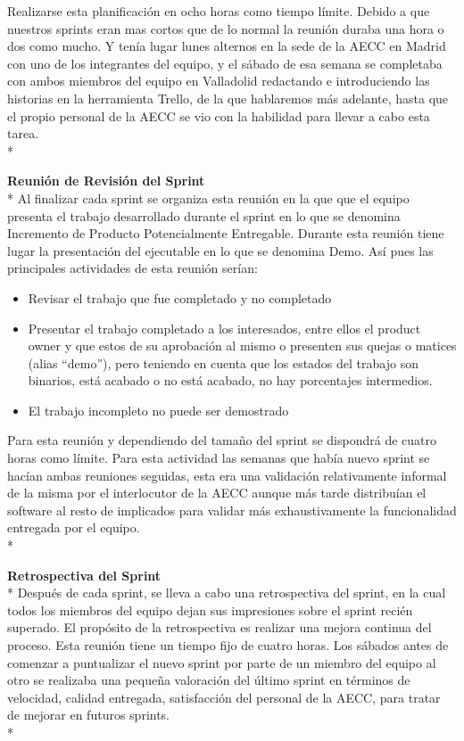 \documentclass[../pfc.tex]{subfiles}
\begin{document}
	Realizarse esta planificación en ocho horas como tiempo límite. Debido a que nuestros sprints eran mas cortos que de lo normal la reunión duraba una hora o dos como mucho. Y tenía lugar lunes alternos en la sede de la AECC en Madrid con uno de los integrantes del equipo, y el sábado de esa semana se completaba con ambos miembros del equipo en Valladolid redactando e introduciendo las historias en la herramienta Trello, de la que hablaremos más adelante, hasta que el propio personal de la AECC se vio con la habilidad para llevar a cabo esta tarea.\\*
	
	\textbf{Reunión de Revisión del Sprint}\\*
	Al finalizar cada sprint se organiza esta reunión en la que que el equipo presenta el trabajo desarrollado durante el sprint en lo que se denomina Incremento de Producto Potencialmente Entregable. Durante esta reunión tiene lugar la presentación del ejecutable en lo que se denomina Demo. Así pues las principales actividades de esta reunión serían:
	\begin{itemize} 
		\item Revisar el trabajo que fue completado y no completado 
		\item 	Presentar el trabajo completado a los interesados, entre ellos el product owner y que estos de su aprobación al mismo o presenten sus quejas o matices (alias “demo”), pero teniendo en cuenta que los estados del trabajo son binarios, está acabado o no está acabado, no hay porcentajes intermedios. 
		\item El trabajo incompleto no puede ser demostrado 
	\end{itemize}
	
	Para esta reunión y dependiendo del tamaño del sprint se dispondrá de cuatro horas como límite. Para esta actividad las semanas que había nuevo sprint se hacían ambas reuniones seguidas, esta era una validación relativamente informal de la misma por el interlocutor de la AECC aunque más tarde distribuían el software al resto de implicados para validar más exhaustivamente la funcionalidad entregada por el equipo. \\*
	
	\textbf{Retrospectiva del Sprint }\\*
	Después de cada sprint, se lleva a cabo una retrospectiva del sprint, en la cual todos los miembros del equipo dejan sus impresiones sobre el sprint recién superado. El propósito de la retrospectiva es realizar una mejora continua del proceso. Esta reunión tiene un tiempo fijo de cuatro horas. Los sábados antes de comenzar a puntualizar el nuevo sprint por parte de un miembro del equipo al otro  se realizaba una pequeña valoración del último sprint en términos de velocidad, calidad entregada, satisfacción del personal de la AECC, para tratar de mejorar en futuros sprints.\\*
	
\end{document}
